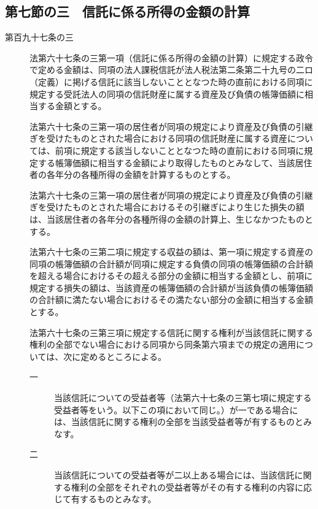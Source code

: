 \documentclass[twocolumn,a4j,10pt]{ltjtarticle}
\begin{document}
\subsection*{第七節の三　信託に係る所得の金額の計算}
\begin{description}
\item[第百九十七条の三]法第六十七条の三第一項（信託に係る所得の金額の計算）に規定する政令で定める金額は、同項の法人課税信託が法人税法第二条第二十九号の二ロ（定義）に掲げる信託に該当しないこととなつた時の直前における同項に規定する受託法人の同項の信託財産に属する資産及び負債の帳簿価額に相当する金額とする。
\item[]法第六十七条の三第一項の居住者が同項の規定により資産及び負債の引継ぎを受けたものとされた場合における同項の信託財産に属する資産については、前項に規定する該当しないこととなつた時の直前における同項に規定する帳簿価額に相当する金額により取得したものとみなして、当該居住者の各年分の各種所得の金額を計算するものとする。
\item[]法第六十七条の三第一項の居住者が同項の規定により資産及び負債の引継ぎを受けたものとされた場合におけるその引継ぎにより生じた損失の額は、当該居住者の各年分の各種所得の金額の計算上、生じなかつたものとする。
\item[]法第六十七条の三第二項に規定する収益の額は、第一項に規定する資産の同項の帳簿価額の合計額が同項に規定する負債の同項の帳簿価額の合計額を超える場合におけるその超える部分の金額に相当する金額とし、前項に規定する損失の額は、当該資産の帳簿価額の合計額が当該負債の帳簿価額の合計額に満たない場合におけるその満たない部分の金額に相当する金額とする。
\item[]法第六十七条の三第三項に規定する信託に関する権利が当該信託に関する権利の全部でない場合における同項から同条第六項までの規定の適用については、次に定めるところによる。
\begin{description}
\item[一]当該信託についての受益者等（法第六十七条の三第七項に規定する受益者等をいう。以下この項において同じ。）が一である場合には、当該信託に関する権利の全部を当該受益者等が有するものとみなす。
\item[二]当該信託についての受益者等が二以上ある場合には、当該信託に関する権利の全部をそれぞれの受益者等がその有する権利の内容に応じて有するものとみなす。
\end{description}
\end{description}
\end{document}
